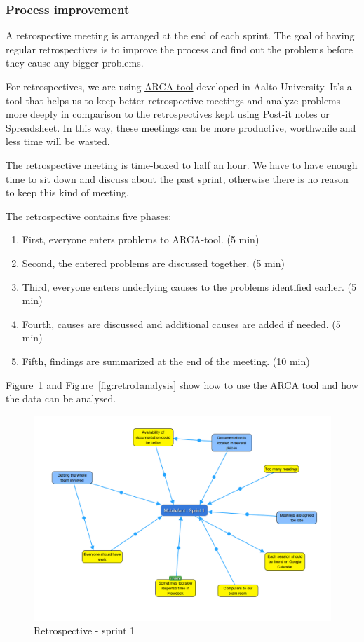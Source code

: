 \subsubsection{Process improvement}

A retrospective meeting is arranged at the end of each sprint. The goal of
having regular retrospectives is to improve the process and find out the
problems before they cause any bigger problems.

For retrospectives, we are using
\href{http://wirca.soberit.hut.fi/prod/}{ARCA-tool} developed in Aalto
University. It's a tool that helps us to keep better retrospective meetings and
analyze problems more deeply in comparison to the retrospectives kept using
Post-it notes or Spreadsheet. In this way, these meetings can be more
productive, worthwhile and less time will be wasted.

The retrospective meeting is time-boxed to half an hour. We have to have enough
time to sit down and discuss about the past sprint, otherwise there is no reason
to keep this kind of meeting.

The retrospective contains five phases:

\begin{enumerate}
\item First, everyone enters problems to ARCA-tool. (5 min)
\item Second, the entered problems are discussed together. (5 min)
\item Third, everyone enters underlying causes to the problems identified
earlier. (5 min)
\item Fourth, causes are discussed and additional causes are added if needed.
(5 min)
\item Fifth, findings are summarized at the end of the meeting. (10 min)
\end{enumerate}

Figure~\ref{fig:retro1} and Figure~\ref{fig:retro1analysis} show how to use the
ARCA tool and how the data can be analysed. 

\begin{figure}[H]
\centering
\includegraphics[width=1\textwidth]{imgs/retro-sprint1.png}
\caption{Retrospective - sprint 1}
\label{fig:retro1}
\end{figure}

